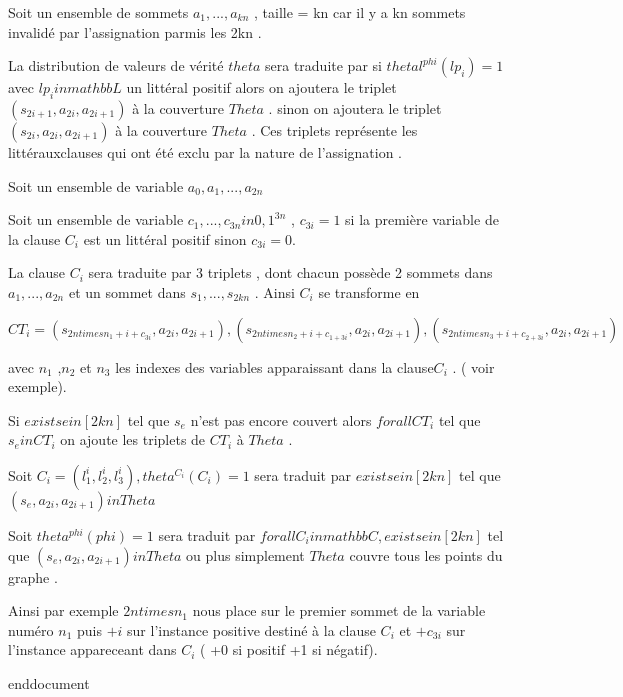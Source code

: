 Soit un ensemble de sommets  ${a_1,...,a_{kn}}$ , taille = kn car il y a kn sommets invalidé par l'assignation parmis les 2kn . 

La distribution de valeurs de vérité $theta$ sera traduite par 
si $thetal^{phi}(lp_i) =1$ avec $lp_i in mathbb{L} $ un littéral positif  alors on ajoutera le triplet $(s_{2i+1},a_{2i},a_{2i+1})$ à la couverture $Theta$ .
sinon on ajoutera le triplet $(s_{2i},a_{2i},a_{2i+1})$ à la couverture $Theta$ .
Ces triplets représente  les littérauxclauses qui ont été exclu par la nature de l'assignation .

Soit un ensemble de variable  ${a_0,a_1,...,a_{2n}}$ 

Soit un ensemble de variable  ${c_1,...,c_{3n}} in {0,1}^{3n}$ , $c_{3i}=1$ si la première variable de la clause $C_i$  est un littéral positif sinon $c_{3i}=0$.


La clause $C_i$ sera traduite par 3 triplets , dont chacun possède 2 sommets dans $ {a_1,...,a_{2n}} $ et un sommet dans ${s_1,...,s_{2kn}} $ .
Ainsi $C_i$ se transforme en 

$CT_i={(s_{2ntimes n_1+i+c_{3i}},a_{2i},a_{2i+1}),(s_{2ntimes n_2+i+c_{1+3i}},a_{2i},a_{2i+1}),(s_{2ntimes n_3+i+c_{2+3i}},a_{2i},a_{2i+1})}$

avec $n_1$ ,$n_2$ et $n_3$ les indexes des variables apparaissant dans la clause$ C_i$ . ( voir exemple).

Si $exists e in [2kn] $ tel que $s_{e}$ n'est pas encore couvert alors $forall CT_i $ tel que $s_{e} in CT_i $  on ajoute les triplets de $ CT_i$ à $Theta$ .


Soit $C_i=(l_1^i ,l_2^i,l_3^i),theta^{C_i}(C_i)=1 $  sera traduit par $exists e in [2kn] $ tel que  $(s_{e},a_{2i},a_{2i+1}) in Theta $

Soit $theta^{phi}(phi)=1 $  sera traduit par $forall C_i in mathbb{C} , exists e in [2kn] $ tel que  $(s_{e},a_{2i},a_{2i+1}) in Theta $ ou plus simplement $Theta$ couvre tous les points du graphe . 


Ainsi par exemple $2ntimes n_1$ nous place sur le premier sommet de la variable numéro $n_1$ puis $+i$ sur l'instance positive destiné à la clause $C_i$ et $+c_{3i}$ sur l'instance appareceant dans $C_i$ ( +0 si positif +1 si négatif).


end{document}